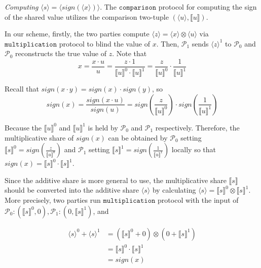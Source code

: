 \documentclass[letterpaper]{article} %
\begin{document}
    \emph{Computing} $\langle s\rangle  = \langle sign(\langle x\rangle)\rangle $.
    The $\mathtt{comparison}$ protocol for computing the sign of the shared value utilizes the comparison two-tuple $(\langle u\rangle,\llbracket u \rrbracket )$.

    In our scheme, firstly, the two parties compute $ \langle z\rangle = \langle x\rangle\otimes \langle u\rangle$ via $\mathtt{multiplication}$ protocol
    to blind the value of $x$.
    Then, $\mathcal{P}_{1}$ sends  $ \langle z\rangle^{1}$ to $\mathcal{P}_{0}$ and
    $\mathcal{P}_{0}$ reconstructs the true value of $z$.
    Note that
    $$x=\frac{x\cdot u}{u}
        =\frac{z\cdot 1}{\llbracket u \rrbracket^{0}\cdot \llbracket u \rrbracket^{1}}
        =\frac{z}{\llbracket u \rrbracket^{0}}\cdot\frac{1}{\llbracket u \rrbracket^{1}}$$

    Recall that $sign(x\cdot y)=sign(x)\cdot sign(y)$, so
    $$sign(x)=\frac{sign(x \cdot u)}{sign(u)}
    =sign(\frac{z}{\llbracket u \rrbracket^{0}})
    \cdot sign(\frac{1}{\llbracket u \rrbracket^{1}})$$



    Because the $\llbracket u \rrbracket^{0}$ and $\llbracket u \rrbracket^{1}$
    is held by $\mathcal{P}_{0}$ and $\mathcal{P}_{1}$ respectively.
    Therefore, the multiplicative share of $sign(x)$ can be obtained by
    $\mathcal{P}_{0}$ setting $\llbracket s \rrbracket^{0}
    =sign(\frac{z}{\llbracket u \rrbracket^{0}})$
    and $\mathcal{P}_{1}$ setting $\llbracket s \rrbracket^{1}
    =sign(\frac{1}{\llbracket u \rrbracket^{1}})$ locally
    so that $sign(x)=\llbracket s \rrbracket^{0}\cdot \llbracket s \rrbracket^{1}$.

    Since the additive share is more general to use,
    the multiplicative share $\llbracket s \rrbracket$ should be converted into the additive share $\langle s\rangle$
    by calculating $\langle s\rangle = \llbracket s \rrbracket ^{0}\otimes \llbracket s \rrbracket ^{1}$.
    More precisely, two parties run $\mathtt{multiplication}$ protocol with the input of
    $\mathcal{P}_{0}:(\llbracket s \rrbracket ^{0},0),\mathcal{P}_{1}:(0,\llbracket s \rrbracket ^{1})$, and


    \begin{align*}
        \langle s\rangle^{0} +\langle s\rangle^{1}&=(\llbracket s \rrbracket ^{0}+0)\otimes (0+\llbracket s \rrbracket ^{1})\\
        &=\llbracket s \rrbracket ^{0}\cdot \llbracket s \rrbracket ^{1}\\
        &=sign(x)
    \end{align*}
\end{document}
